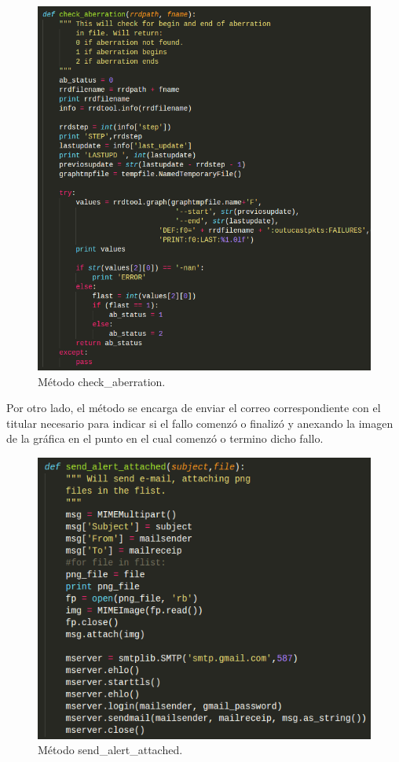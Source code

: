\begin{figure}[htbp!]
		\centering
			\includegraphics[width=.75 \textwidth]{images/codigo5}
		\caption{Método check\_aberration.}
		\label{image:codigo5}
\end{figure}
\FloatBarrier
\newpage
Por otro lado, el método se encarga de enviar el correo correspondiente con el titular necesario para indicar si el fallo comenzó o finalizó y anexando la imagen de la gráfica en el punto en el cual comenzó o termino dicho fallo.
\FloatBarrier
\begin{figure}[htbp!]
		\centering
			\includegraphics[width=.7 \textwidth]{images/codigo6}
		\caption{Método send\_alert\_attached.}
		\label{image:codigo6}
\end{figure}
\FloatBarrier

